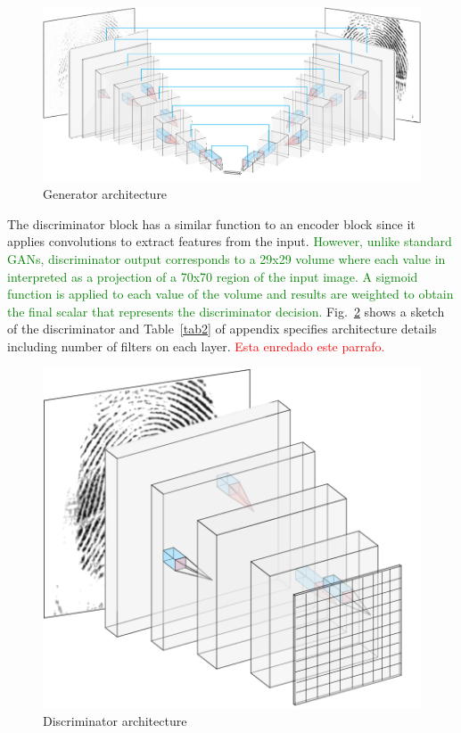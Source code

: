 \documentclass[a4paper,fleqn]{cas-dc}
\begin{document}
\begin{figure}[htbp]
\centerline{\includegraphics[scale=0.36]{figs/generador_p.png}}
\caption{Generator architecture}
\label{fig4}
\end{figure}
The discriminator block has a similar function to an encoder block since it applies convolutions to extract features from the input. \textcolor{green}{However, unlike standard GANs, discriminator output corresponds to a 29x29 volume where each value in interpreted as a projection of a 70x70 region of the input image. A sigmoid function is applied to each value of the volume and results are weighted to obtain the final scalar that represents the discriminator decision.} Fig.~\ref{fig5} shows a sketch of the discriminator and Table~\ref{tab2} of appendix specifies architecture details including number of filters on each layer. \textcolor{red}{Esta enredado este parrafo.}
\begin{figure}[htbp]
\centerline{\includegraphics[scale=0.36]{figs/discriminador_p.png}}
\caption{Discriminator architecture}
\label{fig5}
\end{figure}
\end{document}
